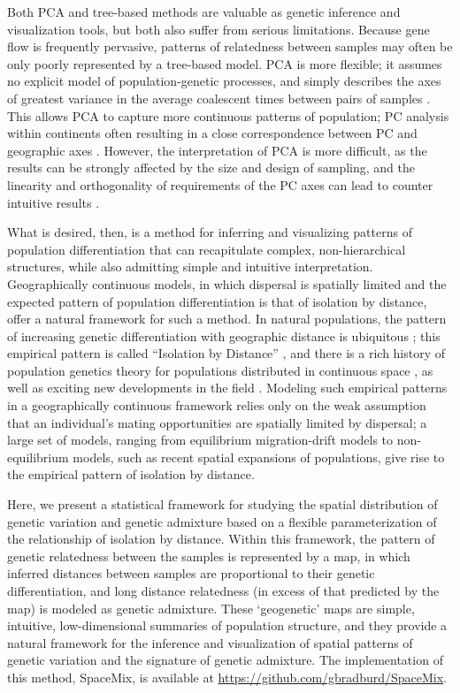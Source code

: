 \documentclass[12pt]{article}
\begin{document}
Both PCA and tree-based methods are valuable as genetic inference and visualization tools, but both also suffer from serious limitations.  Because gene flow is frequently pervasive, patterns of relatedness between samples may often be only poorly represented by a tree-based model.  PCA is more flexible; it assumes no explicit model of population-genetic processes, and simply describes the axes of greatest variance in the average coalescent times between pairs of samples \citep{mcvean_genealogical_2009}. This allows PCA to capture more continuous patterns of population; PC analysis within continents often resulting in a close correspondence between PC and geographic axes \citep[e.g.][]{novembre_genes_2008,wang_quantitative_2012}.  However, the interpretation of PCA is more difficult, as the results can be strongly affected by the size and design of sampling, and the linearity and orthogonality of requirements of the PC axes can lead to counter intuitive results \citep{novembre_interpreting_2008, Francois_2010_surfing}.

What is desired, then, is a method for inferring and visualizing patterns of population differentiation that can recapitulate complex, non-hierarchical structures, while also admitting simple and intuitive interpretation.  Geographically continuous models, in which dispersal is spatially limited and the expected pattern of population differentiation is that of isolation by distance, offer a natural framework for such a method.  
In natural populations, the pattern of increasing genetic differentiation with geographic distance is ubiquitous \citep{meirmans2012};
this empirical pattern is called ``Isolation by Distance'' \citep[IBD][]{Wright1943}, 
and there is a rich history of population genetics theory for populations distributed in continuous space \citep{Malecot1975, nagylaki1978diffusion, felsensten1975pain, barton-depaulis-etheridge}, as well as exciting new developments in the field \citep[e.g.][]{Petkova_2014_EEMS}.
Modeling such empirical patterns in a geographically continuous framework relies only on the weak assumption that an individual's mating opportunities are spatially limited by dispersal; a large set of models, ranging from equilibrium migration-drift models to non-equilibrium models, such as recent spatial expansions of populations, give rise to the empirical pattern of isolation by distance.

Here, we present a statistical framework for studying the spatial distribution of genetic variation and genetic admixture based on a flexible parameterization
of the relationship of isolation by distance.
Within this framework, the pattern of genetic relatedness between the samples is represented by a map, in which inferred distances between samples are proportional to their genetic differentiation, and long distance relatedness (in excess of that predicted by the map) is modeled as genetic admixture.
These `geogenetic'  maps are simple, intuitive, low-dimensional summaries of population structure, and they provide a natural framework for the inference and visualization of spatial patterns of genetic variation and the signature of genetic admixture.  The implementation of this method, SpaceMix, is available at \href{https://github.com/gbradburd/SpaceMix}{https://github.com/gbradburd/SpaceMix}.
\end{document}
